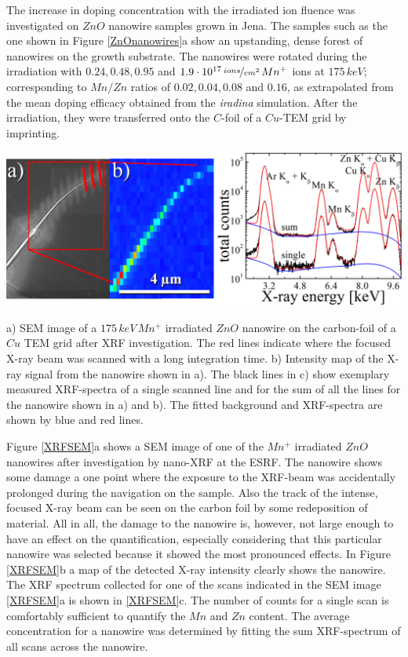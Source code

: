 The increase in doping concentration with the irradiated ion fluence was investigated on $ZnO$ nanowire samples grown in Jena. The samples such as the one shown in Figure \ref{ZnOnanowires}a show an upstanding, dense forest of nanowires on the growth substrate. The nanowires were rotated during the irradiation with $0.24, 0.48, 0.95$ and $1.9\cdot 10^{17}\,\nicefrac{ions}{cm^2}\,Mn^+$ ions at $175\,keV$; corresponding to $Mn/Zn$ ratios of $0.02, 0.04, 0.08$ and $0.16$, as extrapolated from the mean doping efficacy obtained from the \emph{iradina} simulation. After the irradiation, they were transferred onto the $C$-foil of a $Cu$-TEM grid by imprinting.

\begin{Figure}[h]
	\centering
		\includegraphics[width=.8\textwidth]{images/XRFSEM.png}
	\caption{a) SEM image of a $175\,keV\,Mn^+$ irradiated $ZnO$ nanowire on the carbon-foil of a $Cu$ TEM grid after XRF investigation. The red lines indicate where the focused X-ray beam was scanned with a long integration time. b) Intensity map of the X-ray signal from the nanowire shown in a). The black lines in c) show exemplary measured XRF-spectra of a single scanned line and for the sum of all the lines for the nanowire shown in a) and b). The fitted background and XRF-spectra are shown by blue and red lines.} 
	\label{XRFSEM}
\end{Figure} 


Figure \ref{XRFSEM}a shows a SEM image of one of the $Mn^+$ irradiated $ZnO$ nanowires after investigation by nano-XRF at the ESRF. The nanowire shows some damage a one point where the exposure to the XRF-beam was accidentally prolonged during the navigation on the sample. Also the track of the intense, focused X-ray beam can be seen on the carbon foil by some redeposition of material. All in all, the damage to the nanowire is, however, not large enough to have an effect on the quantification, especially considering that this particular nanowire was selected because it showed the most pronounced effects. In Figure \ref{XRFSEM}b a map of the detected X-ray intensity clearly shows the nanowire. The XRF spectrum collected for one of the scans indicated in the SEM image \ref{XRFSEM}a is shown in \ref{XRFSEM}c. The number of counts for a single scan is comfortably sufficient to quantify the $Mn$ and $Zn$ content. The average concentration for a nanowire was determined by fitting the sum XRF-spectrum of all scans across the nanowire.

